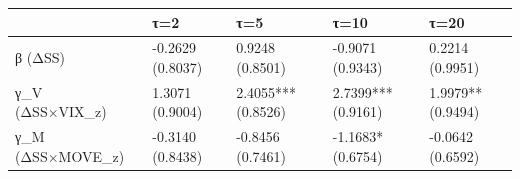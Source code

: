 \begin{tabular}{lllll}
\toprule
 & τ=2 & τ=5 & τ=10 & τ=20 \\
\midrule
β (ΔSS) & -0.2629
(0.8037) & 0.9248
(0.8501) & -0.9071
(0.9343) & 0.2214
(0.9951) \\
γ_V (ΔSS×VIX_z) & 1.3071
(0.9004) & 2.4055***
(0.8526) & 2.7399***
(0.9161) & 1.9979**
(0.9494) \\
γ_M (ΔSS×MOVE_z) & -0.3140
(0.8438) & -0.8456
(0.7461) & -1.1683*
(0.6754) & -0.0642
(0.6592) \\
\bottomrule
\end{tabular}
